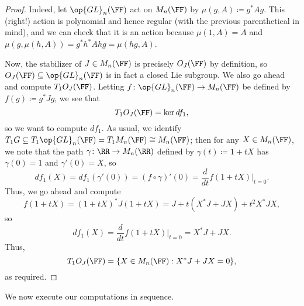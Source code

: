 \documentclass[../notes.tex]{subfiles}
\begin{document}
\begin{proof}
	Indeed, let $\op{GL}_n(\FF)$ act on $M_n(\FF)$ by $\mu(g,A)\coloneqq g^*Ag$. This (right!) action is polynomial and hence regular (with the previous parenthetical in mind), and we can check that it is an action because $\mu(1,A)=A$ and $\mu(g,\mu(h,A))=g^*h^*Ahg=\mu(hg,A)$.

	Now, the stabilizer of $J\in M_n(\FF)$ is precisely $O_J(\FF)$ by definition, so $O_J(\FF)\subseteq\op{GL}_n(\FF)$ is in fact a closed Lie subgroup. We also go ahead and compute $T_1O_J(\FF)$. Letting $f\colon\op{GL}_n(\FF)\to M_n(\FF)$ be defined by $f(g)\coloneqq g^*Jg$, we see that
	\[T_1O_J(\FF)=\ker df_1,\]
	so we want to compute $df_1$. As usual, we identify $T_1G\subseteq T_1\op{GL}_n(\FF)=T_1M_n(\FF)\cong M_n(\FF)$; then for any $X\in M_n(\FF)$, we note that the path $\gamma\colon\RR\to M_n(\RR)$ defined by $\gamma(t)\coloneqq 1+tX$ has $\gamma(0)=1$ and $\gamma'(0)=X$, so
	\[df_1(X)=df_1(\gamma'(0))=(f\circ\gamma)'(0)=\frac d{dt}f(1+tX)\bigg|_{t=0}.\]
	Thus, we go ahead and compute
	\[f(1+tX)=(1+tX)^*J(1+tX)=J+t(X^*J+JX)+t^2X^*JX,\]
	so
	\[df_1(X)=\frac d{dt}f(1+tX)\bigg|_{t=0}=X^*J+JX.\]
	Thus,
	\[T_1O_J(\FF)=\{X\in M_n(\FF):X^*J+JX=0\},\]
	as required.
\end{proof}
We now execute our computations in sequence.
\end{document}
